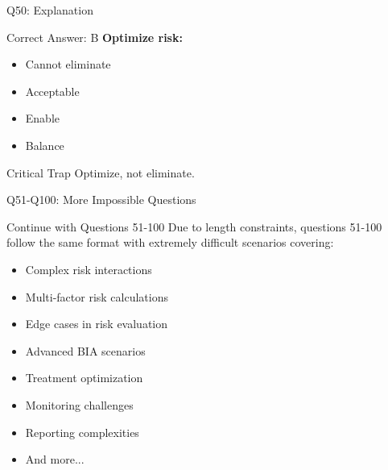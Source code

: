 \documentclass{beamer}
\begin{document}
																													\begin{frame}{Q50: Explanation}
																														\begin{block}{Correct Answer: B}
																															\textbf{Optimize risk:}
																															\begin{itemize}
																																\item Cannot eliminate
																																\item Acceptable
																																\item Enable
																																\item Balance
																															\end{itemize}
																														\end{block}
																														\begin{alertblock}{Critical Trap}
																															Optimize, not eliminate.
																														\end{alertblock}
																													\end{frame}
																													
																													
																													\begin{frame}{Q51-Q100: More Impossible Questions}
																														\begin{block}{Continue with Questions 51-100}
																															Due to length constraints, questions 51-100 follow the same format with extremely difficult scenarios covering:
																															\begin{itemize}
																																\item Complex risk interactions
																																\item Multi-factor risk calculations
																																\item Edge cases in risk evaluation
																																\item Advanced BIA scenarios
																																\item Treatment optimization
																																\item Monitoring challenges
																																\item Reporting complexities
																																\item And more...
																															\end{itemize}
																														\end{block}
																													\end{frame}
																													
\end{document}
